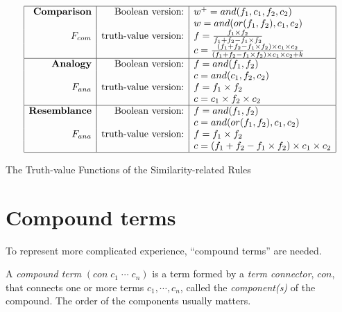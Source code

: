 \begin{table}[htb]
\[\begin{array}{|r|r|l|} \hline
\mbox{\textbf{Comparison}} & \mbox{Boolean version:} & w^+ = and(f_1, c_1, f_2, c_2) \\
								 &					                           & w = and(or(f_1, f_2), c_1, c_2) \\
         F_{com} & \mbox{truth-value version:} & f = \frac{f_1 \times f_2}{f_1 + f_2 - f_1 \times f_2} \\
								 &				                     & c = \frac{(f_1 + f_2 - f_1 \times f_2) \times c_1 \times c_2 }{(f_1 + f_2 - f_1 \times f_2) \times c_1 \times c_2 + k} \\
\hline
\mbox{\textbf{Analogy}} & \mbox{Boolean version:} & f = and(f_1, f_2) \\
								 &					                      & c = and(c_1, f_2, c_2) \\
         F_{ana} & \mbox{truth-value version:} & f = f_1 \times f_2 \\
								 &					                   & c = c_1 \times f_2 \times c_2\\
\hline
\mbox{\textbf{Resemblance}} & \mbox{Boolean version:} & f = and(f_1, f_2) \\
								 &					                          & c = and(or(f_1, f_2), c_1, c_2) \\
         F_{ana} & \mbox{truth-value version:} & f = f_1 \times f_2 \\
								 &					                   & c = (f_1 + f_2 - f_1 \times f_2) \times c_1 \times c_2 \\
\hline \end{array}\]
\caption{The Truth-value Functions of the Similarity-related Rules}
\label{NAL-2-Syllogisms-Functions}
\end{table}


\section{Compound terms}

To represent more complicated experience, ``compound terms'' are needed.
\begin{defi}
A {\em compound term} \((con \; c_1 \; \cdots \; c_n)\) is a term formed by a {\em term connector}, $con$, that connects one or more terms \(c_1, \cdots, c_n\), called the {\em component(s)} of the compound. The order of the components usually matters.
\end{defi}

